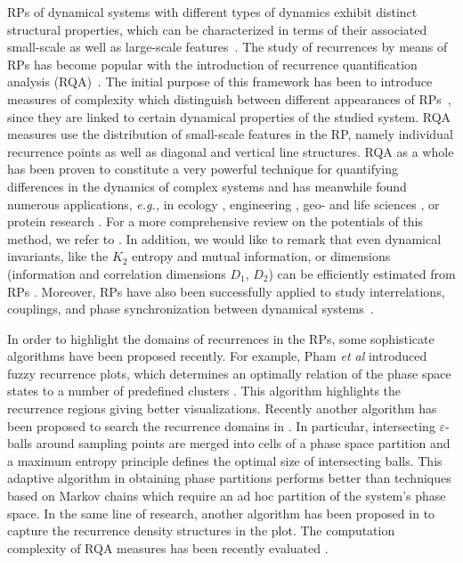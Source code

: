 RPs of dynamical systems with different types of dynamics exhibit distinct structural properties, which can be characterized in terms of their associated small-scale as well as large-scale features~\cite{marwan2007}. The study of recurrences by means of RPs has become popular with the introduction of recurrence quantification analysis (RQA)~\cite{zbilut92,marwan2002}. The initial purpose of this framework has been to introduce measures of complexity which distinguish between different appearances of RPs~\cite{marwan2008}, since they are linked to certain dynamical properties of the studied system. RQA measures use the distribution of small-scale features in the RP, namely individual recurrence points as well as diagonal and vertical line structures. RQA as a whole has been proven to constitute a very powerful technique for quantifying differences in the dynamics of complex systems and has meanwhile found numerous applications, \textit{e.g.,} in ecology \cite{facchini2007}, engineering \cite{litak2009c}, geo- and life sciences \cite{marwan2003climdyn,marwan2007pla}, or protein research \cite{Giuliani2002a,zbilut2004a}. For a more comprehensive review on the potentials of this method, we refer to \cite{marwan2008epjst,webber2009}. In addition, we would like to remark that even dynamical invariants, like the $K_2$ entropy and mutual information, or dimensions (information and correlation dimensions $D_1$, $D_2$) can be efficiently estimated from RPs \cite{thiel2004a,marwan2007}. Moreover, RPs have also been successfully applied to study interrelations, couplings, and phase synchronization between dynamical systems~\cite{marwan2002npg,romano2004,romano2005,Romano2007,vanLeeuwen2009,Nawrath2010}.

In order to highlight the domains of recurrences in the RPs, some sophisticate algorithms have been proposed recently. For example, Pham {\textit {et al}} introduced fuzzy recurrence plots, which determines an optimally relation of the phase space states to a number of predefined clusters \cite{Pham2016}. This algorithm highlights the recurrence regions giving better visualizations. Recently another algorithm has been proposed to search the recurrence domains in \cite{graben2013}. In particular, intersecting $\varepsilon$-balls around sampling points are merged into cells of a phase space partition and a maximum entropy principle defines the optimal size of intersecting balls. This adaptive algorithm in obtaining phase partitions performs better than techniques based on Markov chains which require an ad hoc partition of the system's phase space. In the same line of research, another algorithm has been proposed in \cite{Costa2018} to capture the recurrence density structures in the plot. The computation complexity of RQA measures has been recently evaluated \cite{Martinovic2018}. 


